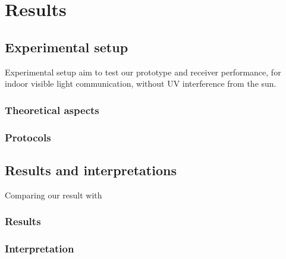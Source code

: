
\chapter{Results} %

\label{Results} %



\section{Experimental setup}

Experimental setup aim to test our prototype and receiver performance, for indoor visible light communication, without UV interference from the sun.




\subsection{Theoretical aspects}
\subsection{Protocols}



\section{Results and interpretations}
Comparing our result with \citep{phycomp}
\subsection{Results}
\subsection{Interpretation}
